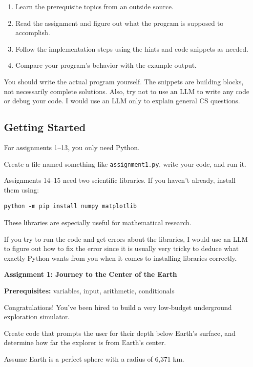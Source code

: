 \documentclass[11pt,letterpaper]{article}
\newcommand{\assignment}[3]{
    \clearpage
    {\Large\bfseries\color{navy} Assignment #1: #2}

    \vspace{2mm}
    {\small\color{darkgray}\textbf{Prerequisites:} #3}

    \vspace{3mm}
}
\begin{document}
\begin{enumerate}
    \item Learn the prerequisite topics from an outside source. 
    \item Read the assignment and figure out what the program is supposed to accomplish.
    \item Follow the implementation steps using the hints and code snippets as needed.
    \item Compare your program's behavior with the example output.
\end{enumerate}

You should write the actual program yourself. The snippets are building blocks, not necessarily complete solutions. Also, try not to use an LLM to write any code or debug your code. I would use an LLM only to explain general CS questions.

\subsection*{Getting Started}

For assignments 1--13, you only need Python.

Create a file named something like \texttt{assignment1.py}, write your code, and run it.

Assignments 14--15 need two scientific libraries. If you haven't already, install them using:
\begin{lstlisting}[language={}]
python -m pip install numpy matplotlib
\end{lstlisting}

These libraries are especially useful for mathematical research. 

If you try to run the code and get errors about the libraries, I would use an LLM to figure out how to fix the error since it is usually very tricky to deduce what exactly Python wants from you when it comes to installing libraries correctly.

\assignment{1}{Journey to the Center of the Earth}
{variables, input, arithmetic, conditionals}

\begin{missionbox}
Congratulations! You've been hired to build a very low-budget underground exploration simulator. 

Create code that prompts the user for their depth below Earth's surface, and determine how far the explorer is from Earth's center.

Assume Earth is a perfect sphere with a radius of 6,371 km. 
\end{missionbox}
\end{document}
